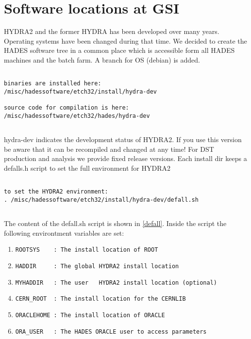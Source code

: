 \section{Software locations at GSI}\label{Chapter_softlocations}

HYDRA2 and the former HYDRA has been developed over many years. Operating
systems have been changed during that time. We decided to create the HADES
software tree in a common place which is accessible form all HADES machines 
and the batch farm. A branch for OS (debian) is added.
 

\begin{lstlisting}

binaries are installed here:
/misc/hadessoftware/etch32/install/hydra-dev
  
source code for compilation is here:
/misc/hadessoftware/etch32/hades/hydra-dev
  
\end{lstlisting}

hydra-dev indicates the development status of HYDRA2. If you use this version 
be aware that it can be recompiled and changed at any time! For DST production
and analysis we provide fixed release versions. Each install dir keeps a defalls.h
script to set the full environment for HYDRA2

\begin{lstlisting}

to set the HYDRA2 environment:
. /misc/hadessoftware/etch32/install/hydra-dev/defall.sh
  
\end{lstlisting}

The content of the defall.sh script is shown in \ref{defall}.
Inside the script the following environtment variables
are set:

\begin{enumerate}
 \item \verb+ROOTSYS    : The install location of ROOT+
 \item \verb+HADDIR     : The global HYDRA2 install location+
 \item \verb+MYHADDIR   : The user   HYDRA2 install location (optional)+
 \item \verb+CERN_ROOT  : The install location for the CERNLIB+
 \item \verb+ORACLEHOME : The install location of ORACLE+
 \item \verb+ORA_USER   : The HADES ORACLE user to access parameters+
\end{enumerate}


